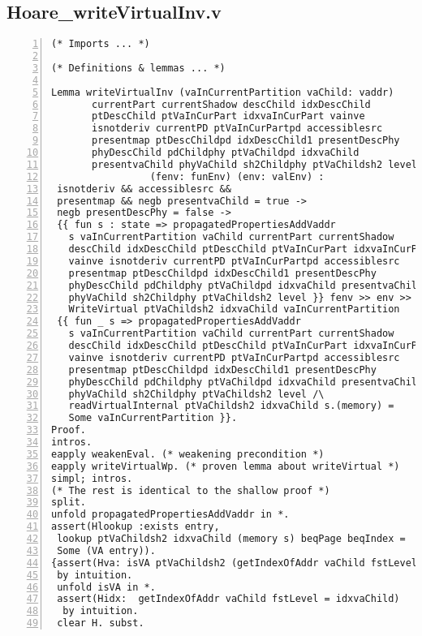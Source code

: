 \begin{appendices}
\chapter{Hoare\_writeVirtualInv.v} \label{writeFile}
\begin{lstlisting}[xleftmargin=-.1\textwidth,
xrightmargin=-.1\textwidth,
mathescape=true,numbers=left]
(* Imports ... *)

(* Definitions & lemmas ... *)

Lemma writeVirtualInv (vaInCurrentPartition vaChild: vaddr)  
       currentPart currentShadow descChild idxDescChild 
       ptDescChild ptVaInCurPart idxvaInCurPart vainve 
       isnotderiv currentPD ptVaInCurPartpd accessiblesrc 
       presentmap ptDescChildpd idxDescChild1 presentDescPhy 
       phyDescChild pdChildphy ptVaChildpd idxvaChild 
       presentvaChild phyVaChild sh2Childphy ptVaChildsh2 level 
                 (fenv: funEnv) (env: valEnv) :
 isnotderiv && accessiblesrc && 
 presentmap && negb presentvaChild = true -> 
 negb presentDescPhy = false -> 
 {{ fun s : state => propagatedPropertiesAddVaddr 
   s vaInCurrentPartition vaChild currentPart currentShadow 
   descChild idxDescChild ptDescChild ptVaInCurPart idxvaInCurPart
   vainve isnotderiv currentPD ptVaInCurPartpd accessiblesrc 
   presentmap ptDescChildpd idxDescChild1 presentDescPhy 
   phyDescChild pdChildphy ptVaChildpd idxvaChild presentvaChild 
   phyVaChild sh2Childphy ptVaChildsh2 level }} fenv >> env >> 
   WriteVirtual ptVaChildsh2 idxvaChild vaInCurrentPartition 
 {{ fun _ s => propagatedPropertiesAddVaddr 
   s vaInCurrentPartition vaChild currentPart currentShadow 
   descChild idxDescChild ptDescChild ptVaInCurPart idxvaInCurPart
   vainve isnotderiv currentPD ptVaInCurPartpd accessiblesrc 
   presentmap ptDescChildpd idxDescChild1 presentDescPhy 
   phyDescChild pdChildphy ptVaChildpd idxvaChild presentvaChild 
   phyVaChild sh2Childphy ptVaChildsh2 level /\ 
   readVirtualInternal ptVaChildsh2 idxvaChild s.(memory) = 
   Some vaInCurrentPartition }}.
Proof.
intros.
eapply weakenEval. (* weakening precondition *)
eapply writeVirtualWp. (* proven lemma about writeVirtual *)
simpl; intros.
(* The rest is identical to the shallow proof *)
split. 
unfold propagatedPropertiesAddVaddr in *.
assert(Hlookup :exists entry, 
 lookup ptVaChildsh2 idxvaChild (memory s) beqPage beqIndex = 
 Some (VA entry)).
{assert(Hva: isVA ptVaChildsh2 (getIndexOfAddr vaChild fstLevel) s) 
 by intuition.
 unfold isVA in *.
 assert(Hidx:  getIndexOfAddr vaChild fstLevel = idxvaChild) 
  by intuition.
 clear H. subst. 

\end{lstlisting}
\end{appendices}
